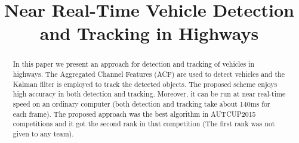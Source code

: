\documentclass[conference]{IEEEtran}
\begin{document}
%
\title{Near Real-Time Vehicle Detection and Tracking in Highways}


\author{
\and
{}
\and
{}
}



\maketitle


\begin{abstract}
In this paper we present an approach for detection and tracking of vehicles in highways. The Aggregated Channel Features (ACF) are used to detect vehicles and the Kalman filter is employed to track the detected objects. The proposed scheme enjoys high accuracy in both detection and tracking. Moreover, it can be run at near real-time speed on an ordinary computer (both detection and tracking take about 140ms for each frame). The proposed approach was the best algorithm in AUTCUP2015 competitions and it got the second rank in that competition (The first rank was not given to any team).
\end{abstract}





%
\IEEEpeerreviewmaketitle
\end{document}
